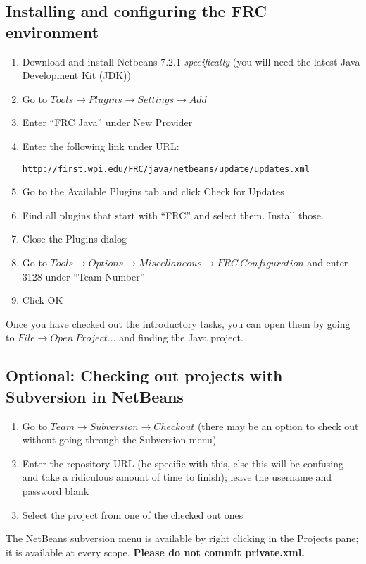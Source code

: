 \documentclass[a4paper]{article}
\begin{document}
\subsection{Installing and configuring the FRC environment}
\begin{enumerate}
\item{Download and install Netbeans 7.2.1 \textit{specifically} (you will need the latest Java Development Kit (JDK))}
\item{Go to $Tools \rightarrow Plugins \rightarrow Settings \rightarrow Add$}
\item{Enter ``FRC Java'' under New Provider}
\item{Enter the following link under URL: \begin{verbatim}http://first.wpi.edu/FRC/java/netbeans/update/updates.xml\end{verbatim}}
\item{Go to the Available Plugins tab and click Check for Updates}
\item{Find all plugins that start with ``FRC'' and select them. Install those.}
\item{Close the Plugins dialog}
\item{Go to $Tools\rightarrow Options\rightarrow Miscellaneous\rightarrow FRC\ Configuration$ and enter 3128 under ``Team Number''}
\item{Click OK}
\end{enumerate}

Once you have checked out the introductory tasks, you can open them by going to $File\rightarrow Open\ Project\ldots$ and finding the Java project.

\subsection{Optional: Checking out projects with Subversion in NetBeans}
\begin{enumerate}
\item{Go to $Team\rightarrow Subversion\rightarrow Checkout$ (there may be an option to check out without going through the Subversion menu)}
\item{Enter the repository URL (be specific with this, else this will be confusing and take a ridiculous amount of time to finish); leave the username and password blank}
\item{Select the project from one of the checked out ones}
\end{enumerate}

The NetBeans subversion menu is available by right clicking in the Projects pane; it is available at every scope. \textbf{Please do not commit private.xml.}
\end{document}
